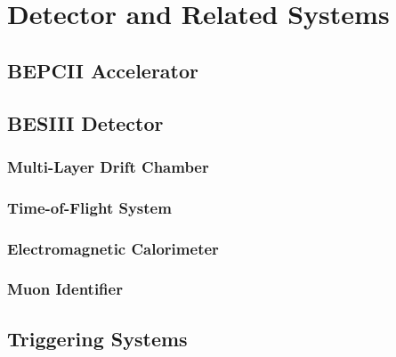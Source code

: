 \chapter{Detector and Related Systems}
\label{ch_detector}

\section{BEPCII Accelerator}

\section{BESIII Detector}

\subsection{Multi-Layer Drift Chamber}

\subsection{Time-of-Flight System}

\subsection{Electromagnetic Calorimeter}

\subsection{Muon Identifier}

\section{Triggering Systems}